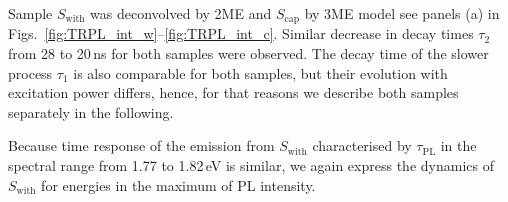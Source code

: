 

%






Sample $S_\mathrm{with}$ was deconvolved by 2ME and $S_\mathrm{cap}$ by 3ME model see panels (a) in Figs.~\ref{fig:TRPL_int_w}--\ref{fig:TRPL_int_c}. 
%
Similar decrease in decay times $\tau_2$ from 28 to 20$\,$ns for both samples were observed. The decay time of the slower process $\tau_1$ is also comparable for both samples, but their evolution with excitation power differs, hence, for that reasons we describe both samples separately in the following.

%

Because time response of the emission from $S_\mathrm{with}$ characterised by $\tau_\mathrm{PL}$ in the spectral range from 1.77 to 1.82$\,$eV is similar, we again express the dynamics of $S_\mathrm{with}$ for energies in the maximum of PL intensity. 
%
%

